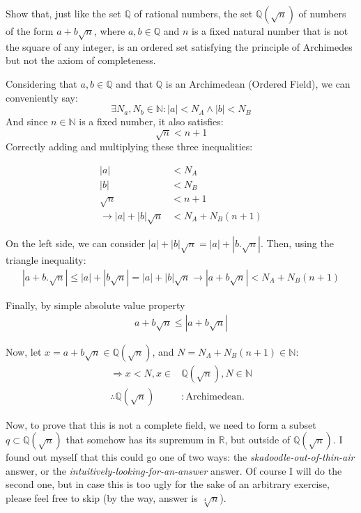 \begin{problem}
Show that, just like the set $\mathbb{Q}$ of rational numbers, the set $\mathbb{Q}(\sqrt{n})$ of numbers of the form $a+b\sqrt{n}$, where $a,b \in \mathbb{Q}$ and $n$ is a fixed natural number that is not the square of any integer, is an ordered set satisfying the principle of Archimedes but not the axiom of completeness.
\end{problem}

\begin{solution}
Considering that $a, b \in \mathbb{Q}$ and that $\mathbb{Q}$ is an Archimedean (Ordered Field), we can conveniently say:
$$\exists N_a, N_b \in \mathbb{N}: |a| < N_A \land |b| < N_B$$
And since $n \in \mathbb{N}$ is a fixed number, it also satisfies:
$$\sqrt{n} < n + 1$$
Correctly adding and multiplying these three inequalities:

\begin{align*}
|a| &< N_A \\
|b| &< N_B \\
\sqrt{n} &< n + 1 \\
\rightarrow |a| + |b|\sqrt{n} &< N_A + N_B (n + 1)
\end{align*}

On the left side, we can consider $|a| + |b|\sqrt{n} = |a| + |b.\sqrt{n}|$. Then, using the triangle inequality:
\begin{align*}
|a + b.\sqrt{n}| \leq |a| + |b\sqrt{n}| = |a| + |b|\sqrt{n}
\rightarrow |a + b\sqrt{n}| < N_A + N_B (n + 1)
\end{align*}

Finally, by simple absolute value property
\begin{align*}
a + b\sqrt{n} \leq |a + b\sqrt{n}|
\end{align*}

Now, let $x = a + b\sqrt{n} \in \mathbb{Q}(\sqrt{n})$, and $N = N_A + N_B (n + 1) \in \mathbb{N}$:
\begin{align*}
\Rightarrow x < N, x \in &\mathbb{Q}(\sqrt{n}), N \in \mathbb{N}\\
\therefore \mathbb{Q}(\sqrt{n})&: \text{Archimedean}.
\end{align*}

Now, to prove that this is not a complete field, we need to form a subset $q \subset \mathbb{Q}(\sqrt{n})$ that somehow has its supremum in $\mathbb{R}$, but outside of $\mathbb{Q}(\sqrt{n})$. I found out myself that this could go one of two ways: the \textit{skadoodle-out-of-thin-air} answer, or the \textit{intuitively-looking-for-an-answer} answer. Of course I will do the second one, but in case this is too ugly for the sake of an arbitrary exercise, please feel free to skip (by the way, answer is $\sqrt[4]{n}$).


\end{solution}
